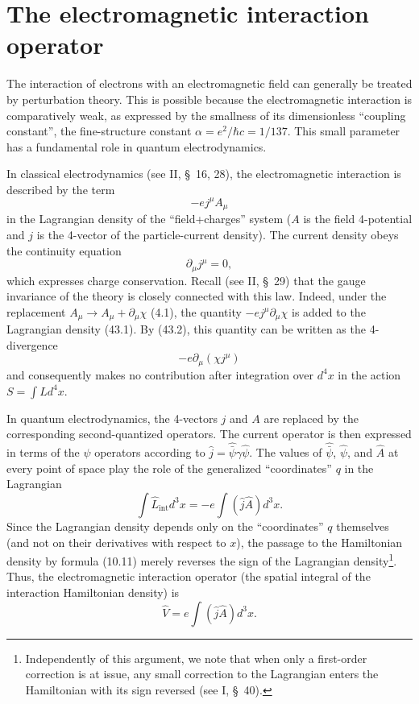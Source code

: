 \section{The electromagnetic interaction operator}

The interaction of electrons with an electromagnetic field can generally be treated by perturbation theory. This is possible because the electromagnetic interaction is comparatively weak, as expressed by the smallness of its dimensionless ``coupling constant'', the fine-structure constant $\alpha=e^2/\hbar c=1/137$. This small parameter has a fundamental role in quantum electrodynamics.

In classical electrodynamics (see II, \S~16, 28), the electromagnetic interaction is described by the term
\begin{equation}
-e j^\mu A_\mu
\tag{43.1}
\end{equation}
in the Lagrangian density of the ``field+charges'' system ($A$ is the field 4-potential and $j$ is the 4-vector of the particle-current density). The current density obeys the continuity equation
\begin{equation}
\partial_\mu j^\mu=0,
\tag{43.2}
\end{equation}
which expresses charge conservation. Recall (see II, \S~29) that the gauge invariance of the theory is closely connected with this law. Indeed, under the replacement $A_\mu\to A_\mu+\partial_\mu\chi$ (4.1), the quantity $-e j^\mu\partial_\mu\chi$ is added to the Lagrangian density (43.1). By (43.2), this quantity can be written as the 4-divergence
\[
-e\partial_\mu(\chi j^\mu)
\]
and consequently makes no contribution after integration over $d^4x$ in the action $S=\int Ld^4x$.

In quantum electrodynamics, the 4-vectors $j$ and $A$ are replaced by the corresponding second-quantized operators. The current operator is then expressed in terms of the $\psi$ operators according to $\hat j=\widehat{\bar\psi}\gamma\hat\psi$. The values of $\widehat{\bar\psi}$, $\hat\psi$, and $\hat A$ at every point of space play the role of the generalized ``coordinates'' $q$ in the Lagrangian
\[
\int\widehat L_{\text{int}}d^3x=-e\int(\hat j\hat A)d^3x.
\]
Since the Lagrangian density depends only on the ``coordinates'' $q$ themselves (and not on their derivatives with respect to $x$), the passage to the Hamiltonian density by formula (10.11) merely reverses the sign of the Lagrangian density\footnote{Independently of this argument, we note that when only a first-order correction is at issue, any small correction to the Lagrangian enters the Hamiltonian with its sign reversed (see I, \S~40).}. Thus, the electromagnetic interaction operator (the spatial integral of the interaction Hamiltonian density) is
\begin{equation}
\hat V=e\int(\hat j\hat A)d^3x.
\tag{43.3}
\end{equation}

